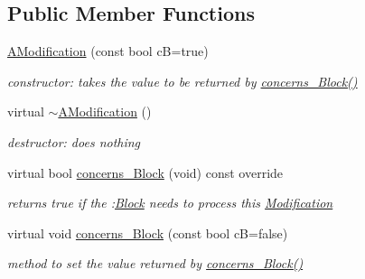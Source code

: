 \subsection*{Public Member Functions}
\begin{DoxyCompactItemize}
\item 
\mbox{\hyperlink{class_s_m_spp__di__unipi__it_1_1_a_modification_a6e08dbd2ad38d75f432eba5188d5c291}{A\+Modification}} (const bool cB=true)
\begin{DoxyCompactList}\small\item\em constructor\+: takes the value to be returned by \mbox{\hyperlink{class_s_m_spp__di__unipi__it_1_1_modification_a22fe0cccfc755cfd89b240587d1f1cad}{concerns\+\_\+\+Block()}} \end{DoxyCompactList}\item 
\mbox{\label{class_s_m_spp__di__unipi__it_1_1_a_modification_afca278920f4bc46e4cec70020a0247e5}} 
virtual \mbox{\hyperlink{class_s_m_spp__di__unipi__it_1_1_a_modification_afca278920f4bc46e4cec70020a0247e5}{$\sim$\+A\+Modification}} ()
\begin{DoxyCompactList}\small\item\em destructor\+: does nothing \end{DoxyCompactList}\item 
virtual bool \mbox{\hyperlink{class_s_m_spp__di__unipi__it_1_1_a_modification_af4b7df5d253c1ae7a94759df4ac83113}{concerns\+\_\+\+Block}} (void) const override
\begin{DoxyCompactList}\small\item\em returns true if the \+:\mbox{\hyperlink{class_s_m_spp__di__unipi__it_1_1_block}{Block}} needs to process this \mbox{\hyperlink{class_s_m_spp__di__unipi__it_1_1_modification}{Modification}} \end{DoxyCompactList}\item 
\mbox{\label{class_s_m_spp__di__unipi__it_1_1_a_modification_a5e1f16234be4cae8d932370368e99b08}} 
virtual void \mbox{\hyperlink{class_s_m_spp__di__unipi__it_1_1_a_modification_a5e1f16234be4cae8d932370368e99b08}{concerns\+\_\+\+Block}} (const bool cB=false)
\begin{DoxyCompactList}\small\item\em method to set the value returned by \mbox{\hyperlink{class_s_m_spp__di__unipi__it_1_1_modification_a22fe0cccfc755cfd89b240587d1f1cad}{concerns\+\_\+\+Block()}} \end{DoxyCompactList}\end{DoxyCompactItemize}
